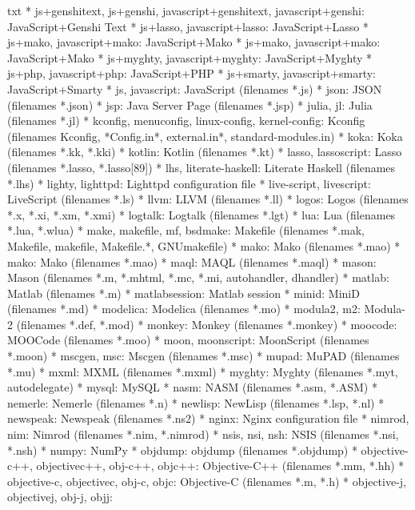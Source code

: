 \documentclass[11pt,oneside]{book}
\begin{document}
\begin{common-format}
\begin{xverbatim}{txt}
* js+genshitext, js+genshi, javascript+genshitext, javascript+genshi:
    JavaScript+Genshi Text 
* js+lasso, javascript+lasso:
    JavaScript+Lasso 
* js+mako, javascript+mako:
    JavaScript+Mako 
* js+mako, javascript+mako:
    JavaScript+Mako 
* js+myghty, javascript+myghty:
    JavaScript+Myghty 
* js+php, javascript+php:
    JavaScript+PHP 
* js+smarty, javascript+smarty:
    JavaScript+Smarty 
* js, javascript:
    JavaScript (filenames *.js)
* json:
    JSON (filenames *.json)
* jsp:
    Java Server Page (filenames *.jsp)
* julia, jl:
    Julia (filenames *.jl)
* kconfig, menuconfig, linux-config, kernel-config:
    Kconfig (filenames Kconfig, *Config.in*, external.in*, standard-modules.in)
* koka:
    Koka (filenames *.kk, *.kki)
* kotlin:
    Kotlin (filenames *.kt)
* lasso, lassoscript:
    Lasso (filenames *.lasso, *.lasso[89])
* lhs, literate-haskell:
    Literate Haskell (filenames *.lhs)
* lighty, lighttpd:
    Lighttpd configuration file 
* live-script, livescript:
    LiveScript (filenames *.ls)
* llvm:
    LLVM (filenames *.ll)
* logos:
    Logos (filenames *.x, *.xi, *.xm, *.xmi)
* logtalk:
    Logtalk (filenames *.lgt)
* lua:
    Lua (filenames *.lua, *.wlua)
* make, makefile, mf, bsdmake:
    Makefile (filenames *.mak, Makefile, makefile, Makefile.*, GNUmakefile)
* mako:
    Mako (filenames *.mao)
* mako:
    Mako (filenames *.mao)
* maql:
    MAQL (filenames *.maql)
* mason:
    Mason (filenames *.m, *.mhtml, *.mc, *.mi, autohandler, dhandler)
* matlab:
    Matlab (filenames *.m)
* matlabsession:
    Matlab session 
* minid:
    MiniD (filenames *.md)
* modelica:
    Modelica (filenames *.mo)
* modula2, m2:
    Modula-2 (filenames *.def, *.mod)
* monkey:
    Monkey (filenames *.monkey)
* moocode:
    MOOCode (filenames *.moo)
* moon, moonscript:
    MoonScript (filenames *.moon)
* mscgen, msc:
    Mscgen (filenames *.msc)
* mupad:
    MuPAD (filenames *.mu)
* mxml:
    MXML (filenames *.mxml)
* myghty:
    Myghty (filenames *.myt, autodelegate)
* mysql:
    MySQL 
* nasm:
    NASM (filenames *.asm, *.ASM)
* nemerle:
    Nemerle (filenames *.n)
* newlisp:
    NewLisp (filenames *.lsp, *.nl)
* newspeak:
    Newspeak (filenames *.ns2)
* nginx:
    Nginx configuration file 
* nimrod, nim:
    Nimrod (filenames *.nim, *.nimrod)
* nsis, nsi, nsh:
    NSIS (filenames *.nsi, *.nsh)
* numpy:
    NumPy 
* objdump:
    objdump (filenames *.objdump)
* objective-c++, objectivec++, obj-c++, objc++:
    Objective-C++ (filenames *.mm, *.hh)
* objective-c, objectivec, obj-c, objc:
    Objective-C (filenames *.m, *.h)
* objective-j, objectivej, obj-j, objj:

\end{xverbatim}
\end{common-format}
\end{document}
